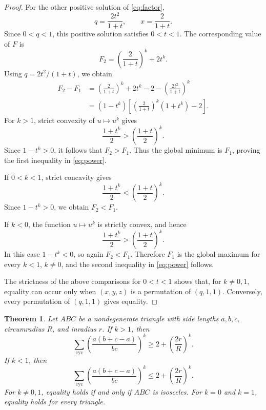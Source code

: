 \documentclass[11pt]{amsart}
\newtheorem{theorem}{Theorem}[section]
\theoremstyle{remark}
\newcommand{\cyc}{\sum_{\mathrm{cyc}}}
\begin{document}
\begin{proof}
For the other positive solution of \eqref{eq:factor},
\[
 q=\frac{2t^2}{1+t},\qquad x=\frac{2}{1+t}.
\]
Since $0<q<1$, this positive solution satisfies $0<t<1$. The corresponding value of $F$ is
\[
 F_2=\left(\frac{2}{1+t}\right)^k+2t^k.
\]
Using $q=2t^2/(1+t)$, we obtain
\begin{align*}
 F_2-F_1
 &=\left(\frac{2}{1+t}\right)^k+2t^k-2
   -\left(\frac{2t^2}{1+t}\right)^k\\
 &=(1-t^k)\left[\left(\frac{2}{1+t}\right)^k(1+t^k)-2\right].
\end{align*}
For $k>1$, strict convexity of $u\mapsto u^k$ gives
\[
 \frac{1+t^k}{2}>\left(\frac{1+t}{2}\right)^k.
\]
Since $1-t^k>0$, it follows that $F_2>F_1$. Thus the global minimum is
$F_1$, proving the first inequality in \eqref{eq:power}.

If $0<k<1$, strict concavity gives
\[
 \frac{1+t^k}{2}<\left(\frac{1+t}{2}\right)^k.
\]
Since $1-t^k>0$, we obtain $F_2<F_1$.

If $k<0$, the function $u\mapsto u^k$ is strictly convex, and hence
\[
 \frac{1+t^k}{2}>\left(\frac{1+t}{2}\right)^k.
\]
In this case $1-t^k<0$, so again $F_2<F_1$. Therefore $F_1$ is the
global maximum for every $k<1$, $k\ne0$, and the second inequality in
\eqref{eq:power} follows.

The strictness of the above comparisons for $0<t<1$ shows that, for
$k\ne0,1$, equality can occur only when $(x,y,z)$ is a permutation of
$(q,1,1)$. Conversely, every permutation of $(q,1,1)$ gives equality.
\end{proof}

\begin{theorem}\label{thm:main}
Let $ABC$ be a nondegenerate triangle with side lengths $a,b,c$, circumradius $R$, and inradius $r$. If $k>1$, then
\begin{equation}\label{eq:mainplus}
 \cyc \left(\frac{a(b+c-a)}{bc}\right)^k
 \ge 2+\left(\frac{2r}{R}\right)^k.
\end{equation}
If $k<1$, then
\begin{equation}\label{eq:mainminus}
 \cyc \left(\frac{a(b+c-a)}{bc}\right)^k
 \le 2+\left(\frac{2r}{R}\right)^k.
\end{equation}
For $k\ne0,1$, equality holds if and only if $ABC$ is isosceles. For
$k=0$ and $k=1$, equality holds for every triangle.
\end{theorem}
\end{document}
